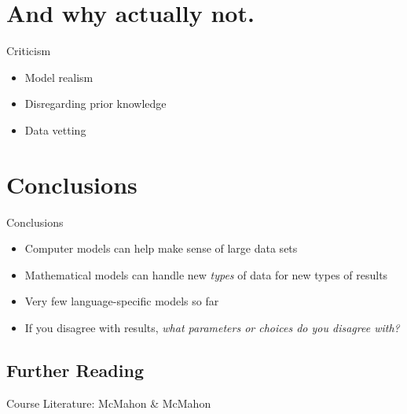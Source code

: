 \documentclass[9pt]{beamer}
\begin{document}
\section{And why actually not.}
\begin{frame}{Criticism}
  \begin{itemize}
  \item Model realism
  \item Disregarding prior knowledge
  \item Data vetting
  \end{itemize}
\end{frame}
\section{Conclusions}
\begin{frame}{Conclusions}
  \begin{itemize}
  \item Computer models can help make sense of large data sets
  \item Mathematical models can handle new \emph{types} of data for new types of results
  \item Very few language-specific models so far
  \item If you disagree with results, \emph{what parameters or choices do you disagree with?}
  \end{itemize}
\end{frame}
\subsection{Further Reading}
\begin{frame}
  Course
  Literature: McMahon \& McMahon
\end{frame}
\end{document}
